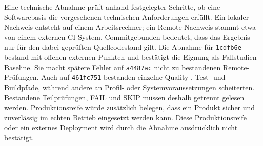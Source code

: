 \begin{beginnerstatement}

Eine technische Abnahme prüft anhand festgelegter Schritte, ob eine
Softwarebasis die vorgesehenen technischen Anforderungen erfüllt. Ein lokaler
Nachweis entsteht auf einem Arbeitsrechner; ein Remote-Nachweis stammt etwa
von einem externen CI-System. Commitgebunden bedeutet, dass das Ergebnis nur
für den dabei geprüften Quellcodestand gilt. Die Abnahme für
\texttt{1cdfb6e} bestand mit offenen externen Punkten und bestätigt die
Eignung als Fallstudien-Baseline. Sie macht spätere Fehler auf
\texttt{a4487ac} nicht zu bestandenen Remote-Prüfungen. Auch auf
\texttt{461fc751} bestanden einzelne Quality-, Test- und Buildpfade, während
andere an Profil- oder Systemvoraussetzungen scheiterten. Bestandene
Teilprüfungen, FAIL und SKIP müssen deshalb getrennt gelesen werden. Produktionsreife würde
zusätzlich belegen, dass ein Produkt sicher und zuverlässig im echten Betrieb
eingesetzt werden kann. Diese Produktionsreife oder ein externes Deployment
wird durch die Abnahme ausdrücklich nicht bestätigt.

\end{beginnerstatement}
